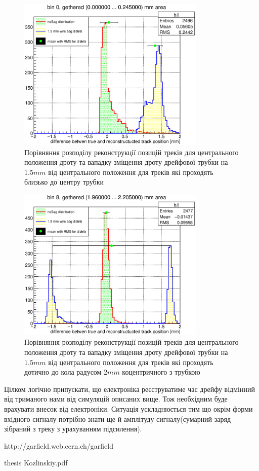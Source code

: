 \documentclass[]{article}
\begin{document}
	\begin{figure}[h!]
	\includegraphics[width=0.8\textwidth]{bin0_0mm.eps}
	\centering
	\caption{ Порівняння розподілу реконструкції позицій треків для центрального положення дроту та вападку зміщення дроту дрейфової трубки на $1.5 mm$ від центрального положення для треків які проходять близько до центру трубки}
	\end{figure}
	
	\begin{figure}[h!]
	\includegraphics[width=0.8\textwidth]{bin8_2mm.eps}
	\centering
	\caption{ Порівняння розподілу реконструкції позицій треків для центрального положення дроту та вападку зміщення дроту дрейфової трубки на $1.5 mm$ від центрального положення для треків які проходять дотично до кола радусом $2mm$  коцентричного з трубкою}
	\end{figure}
	
	Цілком логічно припускати, що електроніка реєструватиме час дрейфу відмінний від триманого нами від симуляцій описаних вище. Тож необхідним буде врахувати внесок від електроніки. Ситуація ускладнюється тим що окрім форми вхідного сигналу потрібно знати ще й амплітуду сигналу(сумарний заряд зібраний з треку з урахуванням підсилення).
	
\newpage
\begin{thebibliography}{00}
	 http://garfield.web.cern.ch/garfield

	  thesis Kozlinskiy.pdf 
	
\end{thebibliography}
	
\end{document}
